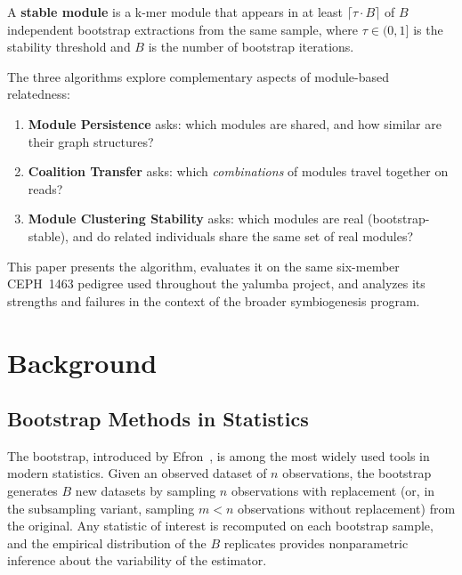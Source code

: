 \documentclass{../yalumba}
\begin{document}
\begin{definition}
A \textbf{stable module} is a k-mer module that appears in at least
$\lceil \tau \cdot B \rceil$ of $B$ independent bootstrap extractions from
the same sample, where $\tau \in (0, 1]$ is the stability threshold and $B$
is the number of bootstrap iterations.
\end{definition}

The three algorithms explore complementary aspects of module-based relatedness:

\begin{enumerate}
  \item \textbf{Module Persistence} asks: which modules are shared, and how
        similar are their graph structures?
  \item \textbf{Coalition Transfer} asks: which \emph{combinations} of modules
        travel together on reads?
  \item \textbf{Module Clustering Stability} asks: which modules are real
        (bootstrap-stable), and do related individuals share the same set of
        real modules?
\end{enumerate}

This paper presents the algorithm, evaluates it on the same six-member
CEPH~1463 pedigree used throughout the yalumba project, and analyzes its
strengths and failures in the context of the broader symbiogenesis program.


\section{Background}
\label{sec:background}

\subsection{Bootstrap Methods in Statistics}

The bootstrap, introduced by Efron~\cite{efron1979bootstrap}, is among the most
widely used tools in modern statistics.  Given an observed dataset of $n$
observations, the bootstrap generates $B$ new datasets by sampling $n$
observations with replacement (or, in the subsampling variant, sampling $m < n$
observations without replacement) from the original.  Any statistic of interest
is recomputed on each bootstrap sample, and the empirical distribution of the
$B$ replicates provides nonparametric inference about the variability of the
estimator.
\end{document}
